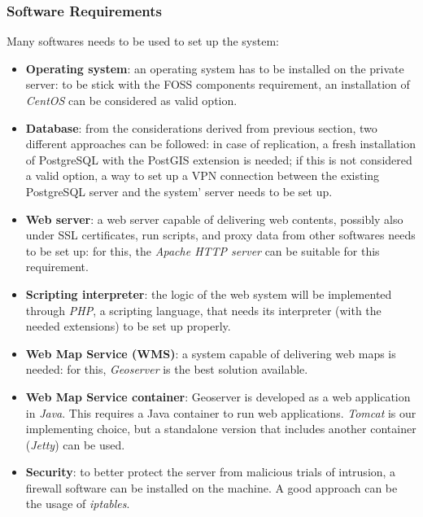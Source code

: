 \subsubsection{Software Requirements}
Many softwares needs to be used to set up the system:
\begin{itemize}
    \item \textbf{Operating system}: an operating system has to be installed on the private server: to be stick with the FOSS components requirement, an installation of \textit{CentOS} can be considered as valid option.
    \item \textbf{Database}: from the considerations derived from previous section, two different approaches can be followed: in case of replication, a fresh installation of PostgreSQL with the PostGIS extension is needed; if this is not considered a valid option, a way to set up a VPN connection between the existing PostgreSQL server and the system' server needs to be set up.
    \item \textbf{Web server}: a web server capable of delivering web contents, possibly also under SSL certificates, run scripts, and proxy data from other softwares needs to be set up: for this, the \textit{Apache HTTP server} can be suitable for this requirement.
    \item \textbf{Scripting interpreter}: the logic of the web system will be implemented through \textit{PHP}, a scripting language, that needs its interpreter (with the needed extensions) to be set up properly.
    \item \textbf{Web Map Service (WMS)}: a system capable of delivering web maps is needed: for this, \textit{Geoserver} is the best solution available.
    \item \textbf{Web Map Service container}: Geoserver is developed as a web application in \textit{Java}. This requires a Java container to run web applications. \textit{Tomcat} is our implementing choice, but a standalone version that includes another container (\textit{Jetty}) can be used.
    \item \textbf{Security}: to better protect the server from malicious trials of intrusion, a firewall software can be installed on the machine. A good approach can be the usage of \textit{iptables}. 
\end{itemize}

